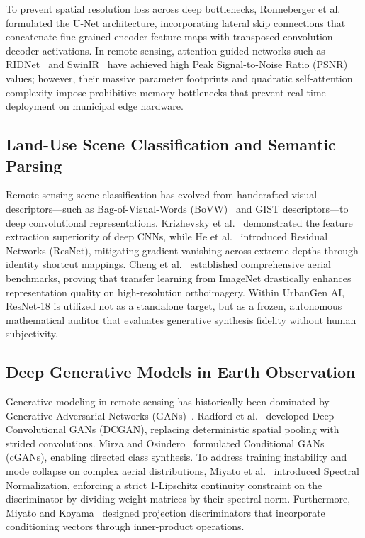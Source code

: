 \documentclass[journal]{IEEEtran}
\begin{document}
To prevent spatial resolution loss across deep bottlenecks, Ronneberger et al.~\cite{ronneberger2015u} formulated the U-Net architecture, incorporating lateral skip connections that concatenate fine-grained encoder feature maps with transposed-convolution decoder activations. In remote sensing, attention-guided networks such as RIDNet~\cite{anwar2019real} and SwinIR~\cite{liang2021swinir} have achieved high Peak Signal-to-Noise Ratio (PSNR) values; however, their massive parameter footprints and quadratic self-attention complexity impose prohibitive memory bottlenecks that prevent real-time deployment on municipal edge hardware.

\subsection{Land-Use Scene Classification and Semantic Parsing}
Remote sensing scene classification has evolved from handcrafted visual descriptors---such as Bag-of-Visual-Words (BoVW)~\cite{yang2010bag} and GIST descriptors---to deep convolutional representations. Krizhevsky et al.~\cite{krizhevsky2012imagenet} demonstrated the feature extraction superiority of deep CNNs, while He et al.~\cite{he2016deep} introduced Residual Networks (ResNet), mitigating gradient vanishing across extreme depths through identity shortcut mappings. Cheng et al.~\cite{cheng2017remote} established comprehensive aerial benchmarks, proving that transfer learning from ImageNet drastically enhances representation quality on high-resolution orthoimagery. Within UrbanGen AI, ResNet-18 is utilized not as a standalone target, but as a frozen, autonomous mathematical auditor that evaluates generative synthesis fidelity without human subjectivity.

\subsection{Deep Generative Models in Earth Observation}
Generative modeling in remote sensing has historically been dominated by Generative Adversarial Networks (GANs)~\cite{goodfellow2014generative}. Radford et al.~\cite{radford2015unsupervised} developed Deep Convolutional GANs (DCGAN), replacing deterministic spatial pooling with strided convolutions. Mirza and Osindero~\cite{mirza2014conditional} formulated Conditional GANs (cGANs), enabling directed class synthesis. To address training instability and mode collapse on complex aerial distributions, Miyato et al.~\cite{miyato2018spectral} introduced Spectral Normalization, enforcing a strict 1-Lipschitz continuity constraint on the discriminator by dividing weight matrices by their spectral norm. Furthermore, Miyato and Koyama~\cite{miyato2018cgans} designed projection discriminators that incorporate conditioning vectors through inner-product operations.
\end{document}
